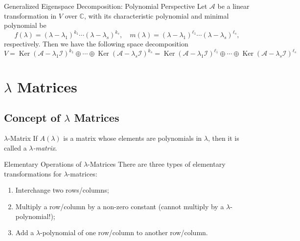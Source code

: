\begin{theorem}{Generalized Eigenspace Decomposition: Polynomial Perspective}{}
  Let $\mathcal{A}$ be a linear transformation in $V$ over $\mathbb{C}$,
  with its characteristic polynomial and minimal polynomial be
  \begin{equation}
    f(\lambda) = (\lambda - \lambda_1)^{k_1} \cdots (\lambda - \lambda_s)^{k_s}, \quad
    m(\lambda) = (\lambda - \lambda_1)^{\ell_1} \cdots (\lambda - \lambda_s)^{\ell_s},
  \end{equation}
  respectively. Then we have the following space decomposition
  \begin{equation}
    V = \operatorname{Ker} (\mathcal{A} - \lambda_1 \mathcal{I})^{k_1} \oplus
    \cdots \oplus \operatorname{Ker}(\mathcal{A} - \lambda_s \mathcal{I})^{k_s}
    = \operatorname{Ker}(\mathcal{A} - \lambda_1 \mathcal{I})^{\ell_1} \oplus
    \cdots \oplus \operatorname{Ker}(\mathcal{A} - \lambda_s \mathcal{I})^{\ell_s}
  \end{equation}
\end{theorem}

\section{$\lambda$ Matrices}

\subsection{Concept of $\lambda$ Matrices}

\begin{definition}{$\lambda$-Matrix}{}
  If $A(\lambda)$ is a matrix whose elements are polynomials in $\lambda$,
  then it is called a \emph{$\lambda$-matrix}.
\end{definition}

\begin{definition}{Elementary Operations of $\lambda$-Matrices}{}
  There are three types of elementary transformations for $\lambda$-matrices:
  \begin{enumerate}
  \item Interchange two rows/columns;
  \item Multiply a row/column by a non-zero constant (cannot multiply by a $\lambda$-polynomial!);
  \item Add a $\lambda$-polynomial of one row/column to another row/column.
  \end{enumerate}
\end{definition}

